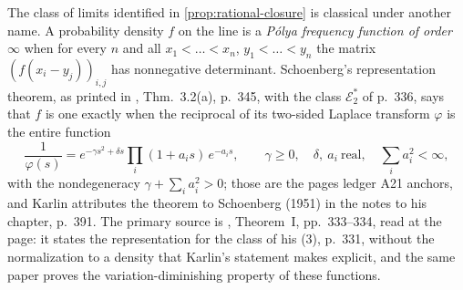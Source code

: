 \begin{remark}
\label{rem:polya-limits}
The class of limits identified in \ref{prop:rational-closure} is classical under another name. A
probability density $f$ on the line is a \emph{P\'olya frequency function of order $\infty$} when
for every $n$ and all $x_1 < \dots < x_n$, $y_1 < \dots < y_n$ the matrix $(f(x_i - y_j))_{i,j}$
has nonnegative determinant. Schoenberg's representation theorem, as printed in
, Thm.~3.2(a), p.~345, with the class $\mathcal{E}_2^{*}$ of p.~336, says
that $f$ is one exactly when the reciprocal of its two-sided Laplace transform $\varphi$ is the
entire function
\begin{equation}\label{eq:schoenberg-e2}
  \frac{1}{\varphi(s)} = e^{-\gamma s^2 + \delta s}\prod_i (1 + a_is)\,e^{-a_is},
  \qquad \gamma \ge 0, \quad \delta,\ a_i \ \text{real}, \quad \sum_i a_i^2 < \infty,
\end{equation}
with the nondegeneracy $\gamma + \sum_i a_i^2 > 0$; those are the pages ledger A21 anchors, and
Karlin attributes the theorem to Schoenberg (1951) in the notes to his chapter, p.~391. The primary source is , Theorem~I, pp.~333--334, read at the page: it
states the representation for the class of his (3), p.~331, without the normalization to a
density that Karlin's statement makes explicit, and the same paper proves the
variation-diminishing property of these functions.


\end{remark}
